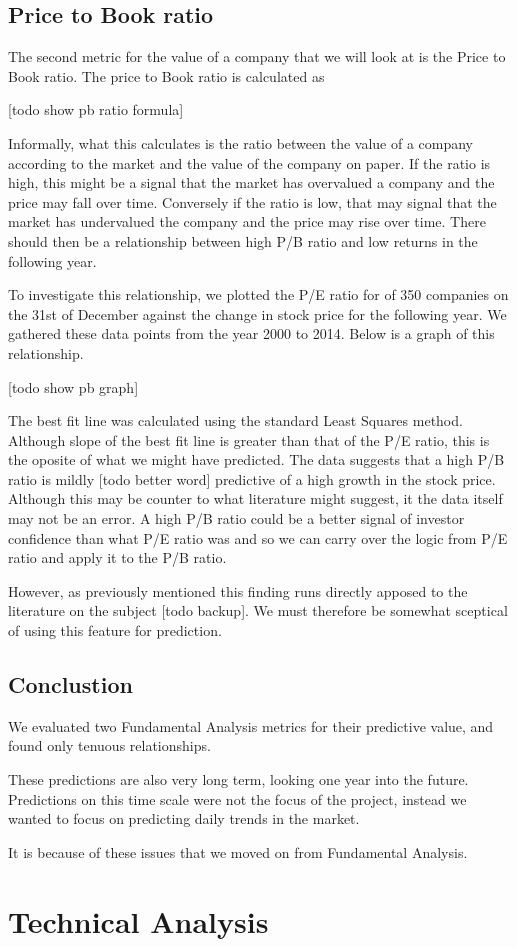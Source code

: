 \documentclass{report}
\begin{document}
\section{Price to Book ratio}

The second metric for the value of a company that we will look at is the Price to Book ratio. The price to Book ratio is calculated as

[todo show pb ratio formula]

Informally, what this calculates is the ratio between the value of a company according to the market and the value of the company on paper. If the ratio is high, this might be a signal that the market has overvalued a company and the price may fall over time. Conversely if the ratio is low, that may signal that the market has undervalued the company and the price may rise over time. There should then be a relationship between high P/B ratio and low returns in the following year. 

To investigate this relationship, we plotted the P/E ratio for of 350 companies on the 31st of December against the change in stock price for the following year. We gathered these data points from the year 2000 to 2014. Below is a graph of this relationship.

[todo show pb graph]

The best fit line was calculated using the standard Least Squares method. Although slope of the best fit line is greater than that of the P/E ratio, this is the oposite of what we might have predicted. The data suggests that a high P/B ratio is mildly [todo better word] predictive of a high growth in the stock price. Although this may be counter to what literature might suggest, it the data itself may not be an error. A high P/B ratio could be a better signal of investor confidence than what P/E ratio was and so we can carry over the logic from P/E ratio and apply it to the P/B ratio. 

However, as previously mentioned this finding runs directly apposed to the literature on the subject [todo backup]. We must therefore be somewhat sceptical of using this feature for prediction. 

\section{Conclustion}

We evaluated two Fundamental Analysis metrics for their predictive value, and found only tenuous relationships.  

These predictions are also very long term, looking one year into the future. Predictions on this time scale were not the focus of the project, instead we wanted to focus on predicting daily trends in the market.

It is because of these issues that we moved on from Fundamental Analysis.

\chapter{Technical Analysis}
\end{document}

